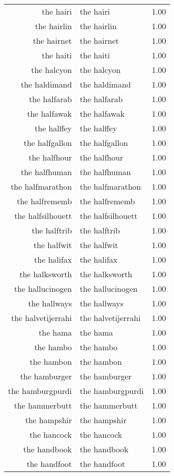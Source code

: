 \begin{table}[ht]
\begin{tabular}{rlr}
  the hairi & the hairi & 1.00 \\ 
  the hairlin & the hairlin & 1.00 \\ 
  the hairnet & the hairnet & 1.00 \\ 
  the haiti & the haiti & 1.00 \\ 
  the halcyon & the halcyon & 1.00 \\ 
  the haldimand & the haldimand & 1.00 \\ 
  the halfarab & the halfarab & 1.00 \\ 
  the halfawak & the halfawak & 1.00 \\ 
  the halffey & the halffey & 1.00 \\ 
  the halfgallon & the halfgallon & 1.00 \\ 
  the halfhour & the halfhour & 1.00 \\ 
  the halfhuman & the halfhuman & 1.00 \\ 
  the halfmarathon & the halfmarathon & 1.00 \\ 
  the halfrememb & the halfrememb & 1.00 \\ 
  the halfsilhouett & the halfsilhouett & 1.00 \\ 
  the halftrib & the halftrib & 1.00 \\ 
  the halfwit & the halfwit & 1.00 \\ 
  the halifax & the halifax & 1.00 \\ 
  the halksworth & the halksworth & 1.00 \\ 
  the hallucinogen & the hallucinogen & 1.00 \\ 
  the hallways & the hallways & 1.00 \\ 
  the halvetijerrahi & the halvetijerrahi & 1.00 \\ 
  the hama & the hama & 1.00 \\ 
  the hambo & the hambo & 1.00 \\ 
  the hambon & the hambon & 1.00 \\ 
  the hamburger & the hamburger & 1.00 \\ 
  the hamburgpurdi & the hamburgpurdi & 1.00 \\ 
  the hammerbutt & the hammerbutt & 1.00 \\ 
  the hampshir & the hampshir & 1.00 \\ 
  the hancock & the hancock & 1.00 \\ 
  the handbook & the handbook & 1.00 \\ 
  the handfoot & the handfoot & 1.00 \\ 

\end{tabular}
\end{table}
